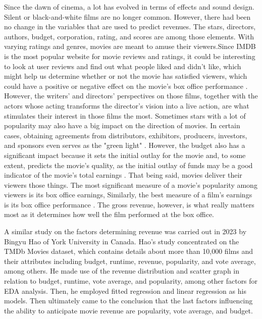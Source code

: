 \documentclass[12pt]{article}
\begin{document}
Since the dawn of cinema, a lot has evolved in terms of effects and sound design. 
Silent or black-and-white films are no longer common. However, there had been no
change in the variables that are used to predict revenues. The stars, directors,
authors, budget, corporation, rating, and scores are among those elements. With 
varying ratings and genres, movies are meant to amuse their viewers.Since IMDB is the
most popular website for movie reviews and ratings, it could be interesting to look at 
user reviews and find out what people liked and didn't like, which might help us determine
whether or not the movie has satisfied viewers, which could have a positive or negative 
effect on the movie's box office performance \citep{3}. However, the writers' and directors' perspectives on
those films, together with the actors whose acting transforms the director's vision 
into a live action, are what stimulates their interest in those films the most. Sometimes
stars with a lot of popularity may also have a big impact on the direction of movies. In certain cases,
obtaining agreements from distributors, exhibitors, producers, investors, and sponsors 
even serves as the "green light" \citep{2}. However, the budget also has a significant 
impact because it sets the initial outlay for the movie and, to some extent, predicts the movie's
quality, as the initial outlay of funds may be a good indicator of the movie's total earnings \citep{1}. 
That being said, movies deliver their viewers those things. The most significant measure of a movie's popularity among viewers
is its box office earnings, Similarly, the best measure of a film's earnings is its box office performance \citep{1}.
The gross revenue, however, is what really matters most as it determines how well the film performed at the box office.

A similar study on the factors determining revenue was carried out in 2023 by Bingyu Hao 
of York University in Canada. Hao's study concentrated on the TMDb Movies dataset, which 
contains details about more than 10,000 films and their attributes including budget, runtime, 
revenue, popularity, and vote average, among others. He made use of the revenue distribution 
and scatter graph in relation to budget, runtime, vote average, and popularity, among other 
factors for EDA analysis. Then, he employed fitted regression and linear regression as his models. Then ultimately
came to the conclusion that the last factors influencing the ability to anticipate movie revenue 
are popularity, vote average, and budget.
\end{document}
